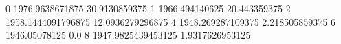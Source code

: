0 1976.9638671875 30.9130859375
1 1966.494140625 20.443359375
2 1958.1444091796875 12.0936279296875
4 1948.269287109375 2.218505859375
6 1946.05078125 0.0
8 1947.9825439453125 1.9317626953125
